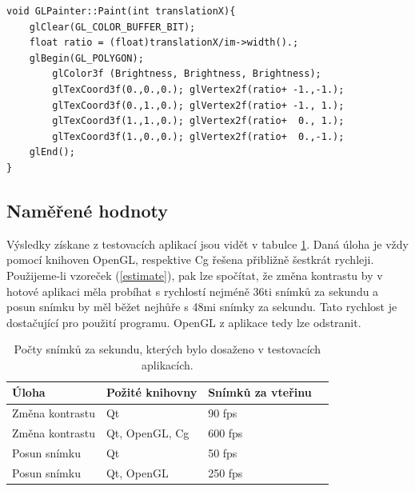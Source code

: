 \begin{lstlisting}[caption={Funkce pro vykreslení snímku využívající OpenGL.}]
void GLPainter::Paint(int translationX){
	glClear(GL_COLOR_BUFFER_BIT);
	float ratio = (float)translationX/im->width().;
	glBegin(GL_POLYGON);
		glColor3f (Brightness, Brightness, Brightness);
		glTexCoord3f(0.,0.,0.);	glVertex2f(ratio+ -1.,-1.);
		glTexCoord3f(0.,1.,0.);	glVertex2f(ratio+ -1., 1.);
		glTexCoord3f(1.,1.,0.);	glVertex2f(ratio+  0., 1.);
		glTexCoord3f(1.,0.,0.);	glVertex2f(ratio+  0.,-1.);
	glEnd();
}
\end{lstlisting}




\subsection{Naměřené hodnoty}

Výsledky získane z testovacích aplikací jsou vidět v tabulce \ref{vysledky}. Daná úloha je vždy pomocí knihoven OpenGL, respektive Cg řešena přibližně šestkrát rychleji. Použijeme-li vzoreček (\ref{estimate}), pak lze spočítat, že změna kontrastu by v hotové aplikaci měla probíhat s rychlostí nejméně 36ti snímků za sekundu a posun snímku by měl běžet nejhůře s 48mi snímky za sekundu. Tato rychlost je dostačující pro použití programu. OpenGL z aplikace tedy lze odstranit.

\noindent
\begin{table}[ht]
	\caption{Počty snímků za sekundu, kterých bylo dosaženo v testovacích aplikacích.}
  \label{vysledky}
	\centering
\begin{tabular}{| p{5cm} | l | l | l | }

  \hline                       
  Úloha & Požité knihovny & Snímků za vteřinu \\
  \hline
  \hline
  Změna kontrastu & Qt &  90 fps\\
  \hline
  Změna kontrastu & Qt, OpenGL, Cg & 600 fps\\
  \hline
  Posun snímku & Qt & 50  fps \\
  \hline
  Posun snímku  & Qt, OpenGL & 250 fps \\
  \hline  
\end{tabular}

\end{table}
